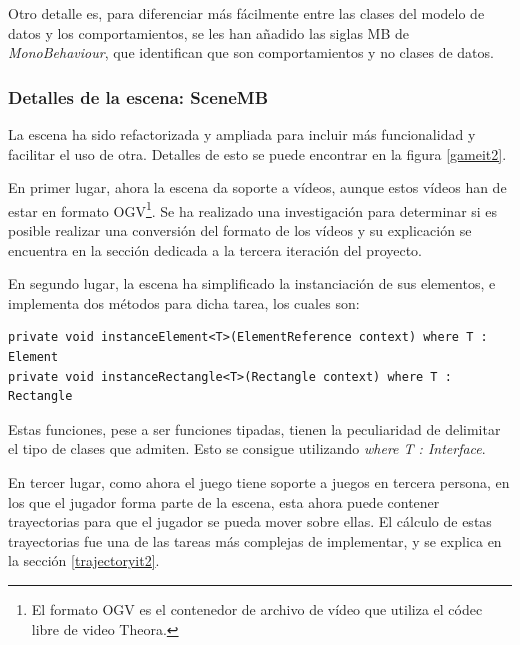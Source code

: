 Otro detalle es, para diferenciar más fácilmente entre las clases del modelo de datos y los comportamientos, se les han añadido las siglas MB de \textit{MonoBehaviour}, que identifican que son comportamientos y no clases de datos.

\subsubsection{Detalles de la escena: SceneMB}

La escena ha sido refactorizada y ampliada para incluir más funcionalidad y facilitar el uso de otra. Detalles de esto se puede encontrar en la figura \ref{gameit2}.

En primer lugar, ahora la escena da soporte a vídeos, aunque estos vídeos han de estar en formato OGV\footnote{El formato OGV es el contenedor de archivo de vídeo que utiliza el códec libre de video Theora.}. Se ha realizado una investigación para determinar si es posible realizar una conversión del formato de los vídeos y su explicación se encuentra en la sección dedicada a la tercera iteración del proyecto.

En segundo lugar, la escena ha simplificado la instanciación de sus elementos, e implementa dos métodos para dicha tarea, los cuales son:

\begin{lstlisting}
private void instanceElement<T>(ElementReference context) where T : Element
private void instanceRectangle<T>(Rectangle context) where T : Rectangle
\end{lstlisting}

Estas funciones, pese a ser funciones tipadas, tienen la peculiaridad de delimitar el tipo de clases que admiten. Esto se consigue utilizando \textit{where T : Interface}.

En tercer lugar, como ahora el juego tiene soporte a juegos en tercera persona, en los que el jugador forma parte de la escena, esta ahora puede contener trayectorias para que el jugador se pueda mover sobre ellas. El cálculo de estas trayectorias fue una de las tareas más complejas de implementar, y se explica en la sección \ref{trajectoryit2}.

